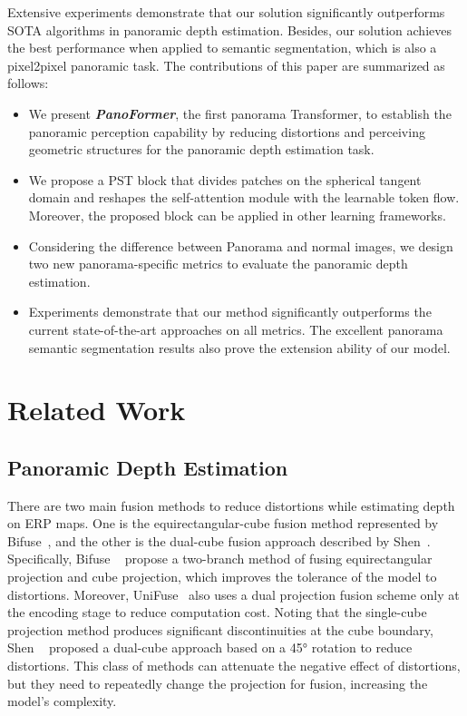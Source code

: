 \documentclass[runningheads]{llncs}
\begin{document}
 
 Extensive experiments demonstrate that our solution significantly outperforms SOTA algorithms in panoramic depth estimation. Besides, our solution achieves the best performance when applied to semantic segmentation, which is also a pixel2pixel panoramic task. The contributions of this paper are summarized as follows:
\begin{itemize}
     \item We present \textbf{\textit{PanoFormer}}, the first panorama Transformer, to establish the panoramic perception capability by reducing distortions and perceiving geometric structures for the panoramic depth estimation task.
    \item We propose a PST block that divides patches on the spherical tangent domain and reshapes the self-attention module with the learnable token flow. Moreover, the proposed block can be applied in other learning frameworks.
    \item Considering the difference between Panorama and normal images, we design two new panorama-specific metrics to evaluate the panoramic depth estimation.
    \item Experiments demonstrate that our method significantly outperforms the current state-of-the-art approaches on all metrics. The excellent panorama semantic segmentation results also prove the extension ability of our model.
 \end{itemize}


\section{Related Work}

\subsection{Panoramic Depth Estimation}
There are two main fusion methods to reduce distortions while estimating depth on ERP maps. One is the equirectangular-cube fusion method represented by Bifuse~\cite{wang2020bifuse}, and the other is the dual-cube fusion approach described by Shen~\cite{shen2021distortion}. Specifically, Bifuse ~\cite{wang2020bifuse} propose a two-branch method of fusing equirectangular projection and cube projection, which improves the tolerance of the model to distortions. Moreover, UniFuse~\cite{jiang2021unifuse} also uses a dual projection fusion scheme only at the encoding stage to reduce computation cost. Noting that the single-cube projection method produces significant discontinuities at the cube boundary, Shen ~\cite{shen2021distortion} proposed a dual-cube approach based on a 45° rotation to reduce distortions. This class of methods can attenuate the negative effect of distortions, but they need to repeatedly change the projection for fusion, increasing the model's complexity.
\end{document}
